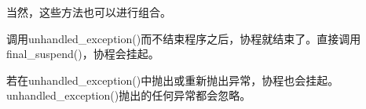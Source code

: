当然，这些方法也可以进行组合。

调用unhandled\_exception()而不结束程序之后，协程就结束了。直接调用final\_suspend()，协程会挂起。

若在unhandled\_exception()中抛出或重新抛出异常，协程也会挂起。unhandled\_exception()抛出的任何异常都会忽略。










































